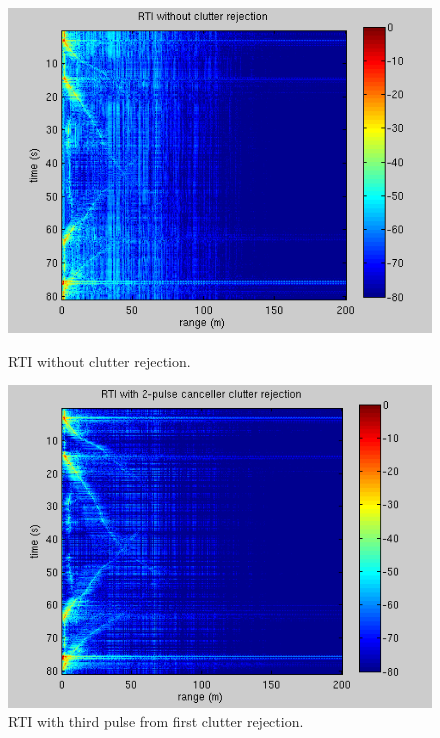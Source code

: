 \documentclass{article}
\begin{document}
\begin{figure}[ht]
\begin{minipage}[b]{0.33\linewidth}
\centering
\includegraphics[width=\textwidth]{Figures/no_rejection_31.png}
\caption{RTI without clutter rejection.}
\label{fig:no_rejection_31}
\end{minipage}
\begin{minipage}[b]{0.33\linewidth}
\centering
\includegraphics[width=\textwidth]{Figures/rejection_31.png}
\caption{RTI with third pulse from first clutter rejection.}
\label{fig:rejection_31}
\end{minipage}
\begin{minipage}[b]{0.33\linewidth}
\centering

\end{minipage}
\end{figure}
\end{document}
